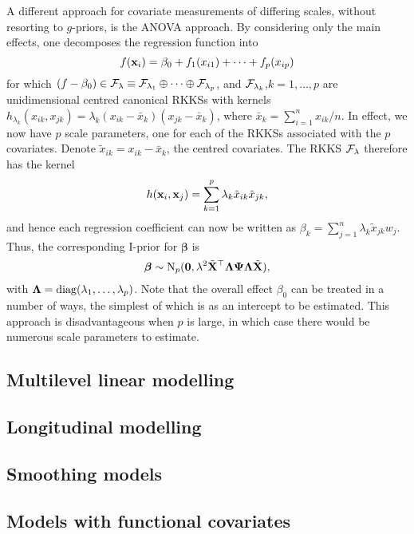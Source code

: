 A different approach for covariate measurements of differing scales, without resorting to $g$-priors, is the ANOVA approach.
By considering only the main effects, one decomposes the regression function into
\[
  f({\mathbf x}_i) = \beta_0 + f_1(x_{i1}) + \cdots + f_p(x_{ip}) 
\]
for which $(f-\beta_0) \in {\mathcal F}_\lambda \equiv {\mathcal F}_{\lambda_1}\oplus\cdots\oplus{\mathcal F}_{\lambda_p}$, and ${\mathcal F}_{\lambda_k}$,$k=1,\dots,p$ are unidimensional centred canonical RKKSs with kernels $h_{\lambda_k}(x_{ik},x_{jk}) = \lambda_k (x_{ik}-\bar x_k) (x_{jk}-\bar x_k)$, where $\bar x_k = \sum_{i=1}^n x_{ik}/n$.
In effect, we now have $p$ scale parameters, one for each of the RKKSs associated with the $p$ covariates.
Denote $\tilde x_{ik} = x_{ik}-\bar x_k$, the centred covariates.
The RKKS ${\mathcal F}_\lambda$ therefore has the kernel
\[
  h({\mathbf x}_i,{\mathbf x}_j) = \sum_{k=1}^p \lambda_k \tilde x_{ik}\tilde x_{jk},
\]
and hence each regression coefficient can now be written as $\beta_k =  \sum_{j=1}^n  \lambda_k \tilde x_{jk}w_j$.
Thus, the corresponding I-prior for $\boldsymbol{\beta}$ is
\[
  \boldsymbol{\beta} \sim \operatorname{N}_p({\mathbf 0}, \lambda^2 \tilde{{\mathbf X}}^\top{\bm\Lambda} {\bm\Psi} {\bm\Lambda} \tilde{{\mathbf X}}),
\]
with ${\bm\Lambda} = \operatorname{diag}(\lambda_1,\dots,\lambda_p)$.
Note that the overall effect $\beta_0$ can be treated in a number of ways, the simplest of which is as an intercept to be estimated.
This approach is disadvantageous when $p$ is large, in which case there would be numerous scale parameters to estimate.


\subsection{Multilevel linear modelling}

\subsection{Longitudinal modelling}

\subsection{Smoothing models}

\subsection{Models with functional covariates}

